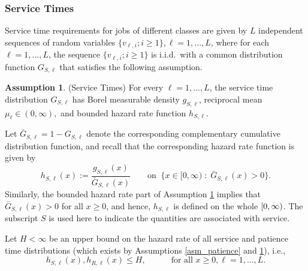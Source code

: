 \documentclass{article}
\theoremstyle{definition}
\newtheorem{assumption}{Assumption}[part]
\numberwithin{equation}{section}
\begin{document}
\subsubsection*{Service Times}
Service time requirements for jobs of different classes are given by $L$ independent sequences of random variables $\{v_{\ell,i};i\geq1\},\ell=1,...,L$, where for each $\ell=1,...,L$, the sequence $\{v_{\ell,i};i\geq1\}$ is i.i.d.\ with a common distribution function $G_{S,\ell}$ that satisfies the following assumption.  
\begin{assumption}\label{asm_service}
  (Service Times) For every $\ell=1,...,L$, the service time distribution $G_{S,\ell}$ has Borel measurable density $g_{S,\ell}$, reciprocal mean $\mu_{\ell}\in(0,\infty),$ and bounded hazard rate function $h_{S,\ell}$.
\end{assumption}
Let $\bar G_{S,\ell}=1-G_{S,\ell}$ denote the corresponding complementary cumulative distribution function, and recall that  the corresponding hazard rate function is given by
\[
h_{S,\ell}(x):=\frac{g_{S,\ell}(x)}{\bar G_{S,\ell}(x)} \quad\quad \text{on} \;\;\{x\in[0,\infty)\;:\; \bar G_{S,\ell}(x)> 0\}.
\]
Similarly, the bounded hazard rate part of Assumption \ref{asm_service} implies that $\bar G_{S,\ell}(x)>0$ for all $x\geq0$, and hence, $h_{S,\ell}$ is defined on the whole $[0,\infty)$. The subscript $S$ is used here to indicate the quantities are associated with service. 


Let $H<\infty$ be an upper bound on the hazard rate of all service and patience time distributions (which exists by Assumptions \ref{asm_patience} and \ref{asm_service}), i.e.,
\begin{equation}\label{def-H}
h_{S,\ell}(x),h_{R,\ell}(x)\leq H,  \quad\quad\quad \text{for all }x\geq0,\ell=1,...,L.
\end{equation}
\end{document}

